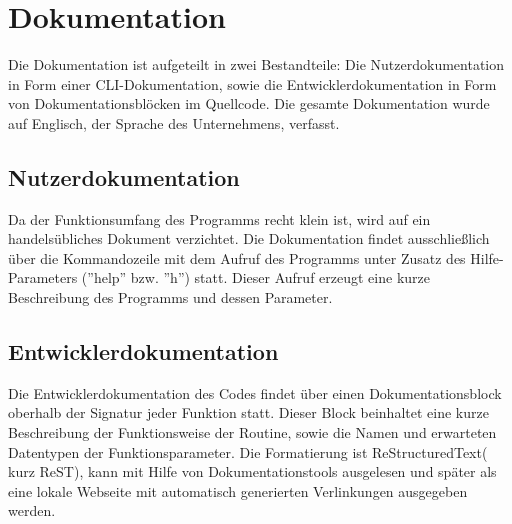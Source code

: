 \section{Dokumentation}
\label{section:dokumentationsphase}
Die Dokumentation ist aufgeteilt in zwei Bestandteile: Die Nutzerdokumentation
in Form einer CLI-Dokumentation, sowie die Entwicklerdokumentation in Form von
Dokumentationsblöcken im Quellcode. Die gesamte Dokumentation wurde auf Englisch,
der Sprache des Unternehmens, verfasst.

\subsection{Nutzerdokumentation}
Da der Funktionsumfang des Programms recht klein ist, wird auf ein handelsübliches
Dokument verzichtet. Die Dokumentation findet ausschließlich über die Kommandozeile mit dem Aufruf des Programms unter Zusatz des Hilfe-Parameters (''help'' bzw. ''h'') statt.
Dieser Aufruf erzeugt eine kurze Beschreibung des Programms und dessen Parameter.

\subsection{Entwicklerdokumentation}
Die Entwicklerdokumentation des Codes findet über einen
Dokumentationsblock oberhalb der Signatur jeder Funktion statt. Dieser Block beinhaltet eine kurze Beschreibung der Funktionsweise der Routine, sowie die Namen und erwarteten Datentypen der Funktionsparameter. Die Formatierung ist ReStructuredText( kurz ReST), kann mit Hilfe von Dokumentationstools ausgelesen und später als eine lokale Webseite mit automatisch generierten Verlinkungen ausgegeben werden.
